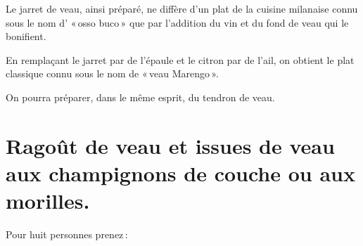 \sk

Le jarret de veau, ainsi préparé, ne diffère d’un plat de la cuisine milanaise
connu sous le nom d' « osso buco » que par l'addition du vin et du fond de veau
qui le bonifient.

\sk

En remplaçant le jarret par de l'épaule et le citron par de l'ail, on obtient le
plat classique connu sous le nom de « veau Marengo ».

\sk

On pourra préparer, dans le même esprit, du tendron de veau.

\section*{\centering Ragoût de veau et issues de veau aux champignons de couche ou aux morilles.}
{}

Pour huit personnes prenez :

\medskip

